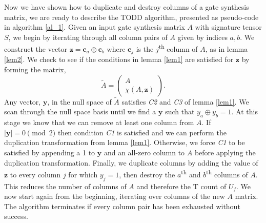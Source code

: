 \documentclass[notitlepage]{article}
\theoremstyle{definition}
\theoremstyle{problem}
\theoremstyle{lemma}
\begin{document}
		Now we have shown how to duplicate and destroy columns of a gate synthesis matrix, we are ready to describe the TODD algorithm, presented as pseudo-code in algorithm \ref{al_1}. Given an input gate synthesis matrix $A$ with signature tensor $S$, we begin by iterating through all column pairs of $A$ given by indices $a,b$. We construct the vector $\mathbf{z}=\mathbf{c}_a \oplus \mathbf{c}_b$ where $\mathbf{c}_j$ is the $j$\textsuperscript{th} column of $A$, as in lemma \ref{lem2}. We check to see if the conditions in lemma \ref{lem1} are satisfied for $\mathbf{z}$ by forming the matrix,
		\begin{equation}
		\tilde{A}=\begin{pmatrix}
		A \\ \chi(A,\mathbf{z})
		\end{pmatrix}.
		\end{equation}
		Any vector, $\mathbf{y}$, in the null space of $\tilde{A}$ satisfies \emph{C2} and \emph{C3} of lemma \ref{lem1}. We scan through the null space basis until we find a $\mathbf{y}$ such that $y_a \oplus y_b = 1$. At this stage we know that we can remove at least one column from $A$. If $|\mathbf{y}|=0 \pmod{2}$ then condition \emph{C1} is satisfied and we can perform the duplication transformation from lemma \ref{lem1}. Otherwise, we force \emph{C1} to be satisfied by appending a 1 to $\mathbf{y}$ and an all-zero column to $A$ before applying the duplication transformation. Finally, we duplicate columns by adding the value of $\mathbf{z}$ to every column $j$ for which $y_j = 1$, then destroy the $a$\textsuperscript{th} and $b$\textsuperscript{th} columns of $A$. This reduces the number of columns of $A$ and therefore the T count of $U_f$. We now start again from the beginning, iterating over columns of the new $A$ matrix. The algorithm terminates if every column pair has been exhausted without success.		

		

	\FloatBarrier
	
	
\end{document}
